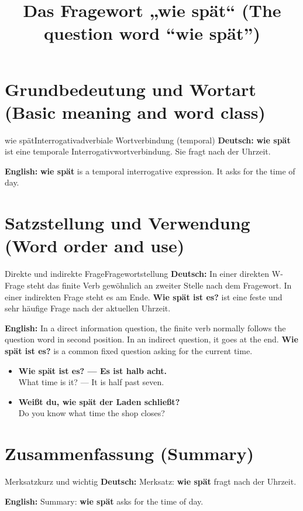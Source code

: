 \documentclass[a4paper,11pt]{article}
\title{Das Fragewort „wie spät“ (The question word “wie spät”)}
\date{}
\newcommand{\GermanText}[1]{\textbf{Deutsch: }#1\par}
\newcommand{\EnglishText}[1]{{\small\color{SoftGray}\textbf{English: }#1\par}}
\newcommand{\ExampleItem}[2]{\item \textbf{#1}\\{\small\color{SoftGray}#2}}
\begin{document}
\maketitle
\tableofcontents
\newpage
\section{Grundbedeutung und Wortart (Basic meaning and word class)}
\begin{grammarentry}{wie spät}{Interrogativadverbiale Wortverbindung (temporal)}
\GermanText{\textbf{wie spät} ist eine temporale Interrogativwortverbindung. Sie fragt nach der Uhrzeit.}
\EnglishText{\textbf{wie spät} is a temporal interrogative expression. It asks for the time of day.}

\end{grammarentry}
\section{Satzstellung und Verwendung (Word order and use)}
\begin{grammarentry}{Direkte und indirekte Frage}{Fragewortstellung}
\GermanText{In einer direkten W-Frage steht das finite Verb gewöhnlich an zweiter Stelle nach dem Fragewort. In einer indirekten Frage steht es am Ende. \textbf{Wie spät ist es?} ist eine feste und sehr häufige Frage nach der aktuellen Uhrzeit.}
\EnglishText{In a direct information question, the finite verb normally follows the question word in second position. In an indirect question, it goes at the end. \textbf{Wie spät ist es?} is a common fixed question asking for the current time.}
\end{grammarentry}
\begin{exbox}\begin{itemize}
\ExampleItem{Wie spät ist es? — Es ist halb acht.}{What time is it? — It is half past seven.}
\ExampleItem{Weißt du, wie spät der Laden schließt?}{Do you know what time the shop closes?}
\end{itemize}\end{exbox}
\section{Zusammenfassung (Summary)}
\begin{grammarentry}{Merksatz}{kurz und wichtig}
\GermanText{Merksatz: \textbf{wie spät} fragt nach der Uhrzeit.}
\EnglishText{Summary: \textbf{wie spät} asks for the time of day.}
\end{grammarentry}
\end{document}
